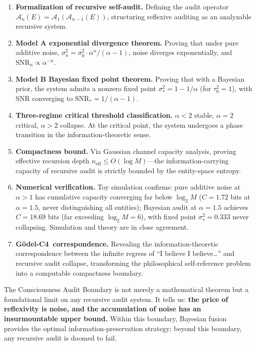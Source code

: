 \documentclass[12pt,a4paper]{article}
\theoremstyle{definition}
\newcommand{\Cfour}{\textsc{C4}}
\newcommand{\AuditOp}{\mathcal{A}}
\newcommand{\SNR}{\mathrm{SNR}}
\begin{document}
\begin{enumerate}[leftmargin=*, label=\textbf{---}]
    \item \textbf{Formalization of recursive self-audit.} Defining the audit operator $\AuditOp_n(E) = \AuditOp_1(\AuditOp_{n-1}(E))$, structuring reflexive auditing as an analyzable recursive system.

    \item \textbf{Model A exponential divergence theorem.} Proving that under pure additive noise, $\sigma_n^2 = \sigma_0^2 \cdot \alpha^n/(\alpha-1)$, noise diverges exponentially, and $\SNR_n \propto \alpha^{-n}$.

    \item \textbf{Model B Bayesian fixed point theorem.} Proving that with a Bayesian prior, the system admits a nonzero fixed point $\sigma_*^2 = 1 - 1/\alpha$ (for $\tau_0^2 = 1$), with SNR converging to $\SNR_* = 1/(\alpha-1)$.

    \item \textbf{Three-regime critical threshold classification.} $\alpha < 2$ stable, $\alpha = 2$ critical, $\alpha > 2$ collapse. At the critical point, the system undergoes a phase transition in the information-theoretic sense.

    \item \textbf{Compactness bound.} Via Gaussian channel capacity analysis, proving effective recursion depth $n_{\text{eff}} \leq O(\log M)$---the information-carrying capacity of recursive audit is strictly bounded by the entity-space entropy.

    \item \textbf{Numerical verification.} Toy simulation confirms: pure additive noise at $\alpha>1$ has cumulative capacity converging far below $\log_2 M$ ($C=1.72$ bits at $\alpha=1.5$, never distinguishing all entities); Bayesian audit at $\alpha=1.5$ achieves $C=18.69$ bits (far exceeding $\log_2 M = 6$), with fixed point $\sigma_*^2 = 0.333$ never collapsing. Simulation and theory are in close agreement.

    \item \textbf{G\"{o}del-\Cfour\ correspondence.} Revealing the information-theoretic correspondence between the infinite regress of ``I believe I believe\ldots'' and recursive audit collapse, transforming the philosophical self-reference problem into a computable compactness boundary.
\end{enumerate}

The Consciousness Audit Boundary is not merely a mathematical theorem but a foundational limit on any recursive audit system. It tells us: \textbf{the price of reflexivity is noise, and the accumulation of noise has an insurmountable upper bound.} Within this boundary, Bayesian fusion provides the optimal information-preservation strategy; beyond this boundary, any recursive audit is doomed to fail.
\end{document}
